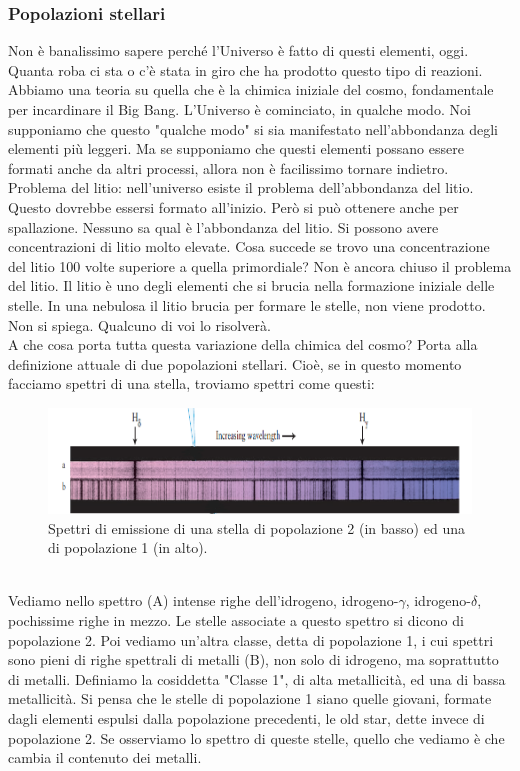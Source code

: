 \documentclass[a4paper,11pt]{article}
\begin{document}
\subsubsection{Popolazioni stellari}
Non è banalissimo sapere perché l'Universo è fatto di questi elementi, oggi. Quanta roba ci sta o c'è stata in giro che ha prodotto questo tipo di reazioni. \\ Abbiamo una teoria su quella che è la chimica iniziale del cosmo, fondamentale per incardinare il Big Bang. L'Universo è cominciato, in qualche modo. Noi supponiamo che questo "qualche modo" si sia manifestato nell'abbondanza degli elementi più leggeri. Ma se supponiamo che questi elementi possano essere formati anche da altri processi, allora non è facilissimo tornare indietro. \\Problema del litio: nell'universo esiste il problema dell'abbondanza del litio. Questo dovrebbe essersi formato all'inizio. Però si può ottenere anche per spallazione. Nessuno sa qual è l'abbondanza del litio. Si possono avere concentrazioni di litio molto elevate. Cosa succede se trovo una concentrazione del litio 100 volte superiore a quella primordiale? Non è ancora chiuso il problema del litio. Il litio è uno degli elementi che si brucia nella formazione iniziale delle stelle. In una nebulosa il litio brucia per formare le stelle, non viene prodotto. Non si spiega. Qualcuno di voi lo risolverà.\\ A che cosa porta tutta questa variazione della chimica del cosmo? Porta alla definizione attuale di due popolazioni stellari. Cioè, se in questo momento facciamo spettri di una stella, troviamo spettri come questi:\\ 
\begin{figure}[h!!]
        \centering
        \includegraphics[width=12cm]{lezione 28 novembre/popolazionistellari1.png}
        \caption{Spettri di emissione di una stella di popolazione 2 (in basso) ed una di popolazione 1 (in alto).}
        \label{lezione 28 novembre/popolazionistellari1.png}
    \end{figure}
    \\
Vediamo nello spettro (A) intense righe dell'idrogeno, idrogeno-$\gamma$, idrogeno-$\delta$, pochissime righe in mezzo. Le stelle associate a questo spettro si dicono di popolazione 2. Poi vediamo un'altra classe, detta di popolazione 1, i cui spettri sono pieni di righe spettrali di metalli (B), non solo di idrogeno, ma soprattutto di metalli. Definiamo la cosiddetta "Classe 1", di alta metallicità, ed una di bassa metallicità. Si pensa che le stelle di popolazione 1 siano quelle giovani, formate dagli elementi espulsi dalla popolazione precedenti, le old star, dette invece di popolazione 2. Se osserviamo lo spettro di queste stelle, quello che vediamo è che cambia il contenuto dei metalli. 
\end{document}
